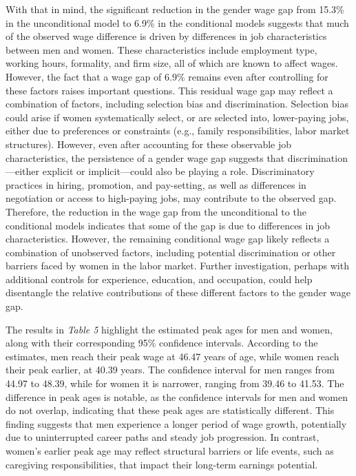 \documentclass[11pt,a4paper,onecolumn]{article}
\begin{document}
        With that in mind, the significant reduction in the gender wage gap from 15.3\% in the unconditional model to 6.9\% in the conditional models suggests that much of the observed wage difference is driven by differences in job characteristics between men and women. These characteristics include employment type, working hours, formality, and firm size, all of which are known to affect wages. However, the fact that a wage gap of 6.9\% remains even after controlling for these factors raises important questions. This residual wage gap may reflect a combination of factors, including selection bias and discrimination. Selection bias could arise if women systematically select, or are selected into, lower-paying jobs, either due to preferences or constraints (e.g., family responsibilities, labor market structures). However, even after accounting for these observable job characteristics, the persistence of a gender wage gap suggests that discrimination—either explicit or implicit—could also be playing a role. Discriminatory practices in hiring, promotion, and pay-setting, as well as differences in negotiation or access to high-paying jobs, may contribute to the observed gap. Therefore, the reduction in the wage gap from the unconditional to the conditional models indicates that some of the gap is due to differences in job characteristics. However, the remaining conditional wage gap likely reflects a combination of unobserved factors, including potential discrimination or other barriers faced by women in the labor market. Further investigation, perhaps with additional controls for experience, education, and occupation, could help disentangle the relative contributions of these different factors to the gender wage gap.
    


        The results in \textit{Table 5} highlight the estimated peak ages for men and women, along with their corresponding 95\% confidence intervals. According to the estimates, men reach their peak wage at 46.47 years of age, while women reach their peak earlier, at 40.39 years. The confidence interval for men ranges from 44.97 to 48.39, while for women it is narrower, ranging from 39.46 to 41.53. The difference in peak ages is notable, as the confidence intervals for men and women do not overlap, indicating that these peak ages are statistically different. This finding suggests that men experience a longer period of wage growth, potentially due to uninterrupted career paths and steady job progression. In contrast, women’s earlier peak age may reflect structural barriers or life events, such as caregiving responsibilities, that impact their long-term earnings potential.
        
\end{document}
